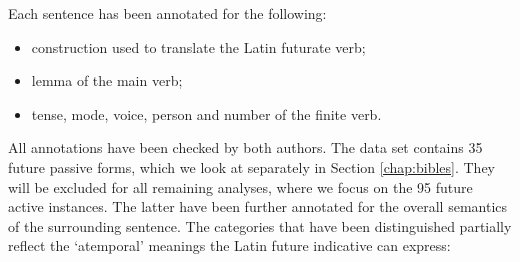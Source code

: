 \documentclass[output=paper,colorlinks,citecolor=brown]{langscibook}
\begin{document}
\begin{minipage}{\textwidth} %
Each sentence has been annotated for the following:
\begin{itemize}
    \item construction used to translate the Latin futurate verb;
    \item lemma of the main verb;
    \item tense, mode, voice, person and number of the finite verb.
\end{itemize}
All annotations have been checked by both authors. The data set contains 35 future passive forms, which we look at separately in Section \ref{chap:bibles}. They will be excluded for all remaining analyses, where we focus on the 95 future active instances. 
The latter have been further annotated for the overall semantics of the surrounding sentence. The categories that have been distinguished partially reflect the `atemporal' meanings the Latin future indicative can express:
\end{minipage}

\largerpage[-1.5]
\end{document}
